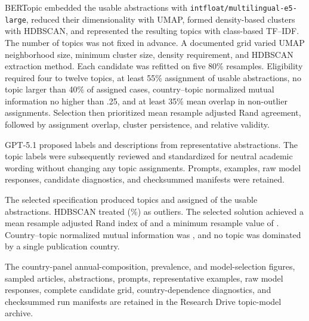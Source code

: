 BERTopic embedded the \DescriptiveTopicUsableN{} usable abstractions with
\texttt{intfloat/}\allowbreak\texttt{multilingual-e5-large}, reduced their
dimensionality with UMAP, formed density-based clusters with HDBSCAN, and
represented the resulting topics with class-based TF--IDF. The number of topics
was not fixed in advance. A documented grid varied UMAP neighborhood size,
minimum cluster size, density requirement, and HDBSCAN extraction method. Each
candidate was refitted on five 80\% resamples. Eligibility required four to
twelve topics, at least 55\% assignment of usable abstractions, no topic larger
than 40\% of assigned cases, country--topic normalized mutual information no
higher than .25, and at least 35\% mean overlap in non-outlier assignments.
Selection then prioritized mean resample adjusted Rand agreement, followed by
assignment overlap, cluster persistence, and relative validity.

GPT-5.1 proposed labels and descriptions from representative abstractions. The
topic labels were subsequently reviewed and standardized for neutral academic
wording without changing any topic assignments. Prompts, examples, raw model
responses, candidate diagnostics, and checksummed manifests were retained.

The selected specification produced \DescriptiveTopicN{} topics and assigned
\DescriptiveTopicInlierN{} of the \DescriptiveTopicUsableN{} usable
abstractions. HDBSCAN treated \DescriptiveTopicOutlierN{}
(\DescriptiveTopicOutlierShare\%) as outliers. The selected solution achieved a
mean resample adjusted Rand index of \DescriptiveTopicMeanResampleARI{} and a
minimum resample value of \DescriptiveTopicMinResampleARI{}. Country--topic
normalized mutual information was \DescriptiveTopicCountryNMI{}, and no topic
was dominated by a single publication country.

The country-panel annual-composition, prevalence, and model-selection figures,
sampled articles, abstractions, prompts, representative examples, raw model
responses, complete candidate grid, country-dependence diagnostics, and
checksummed run manifests are retained in the Research Drive topic-model
archive.
